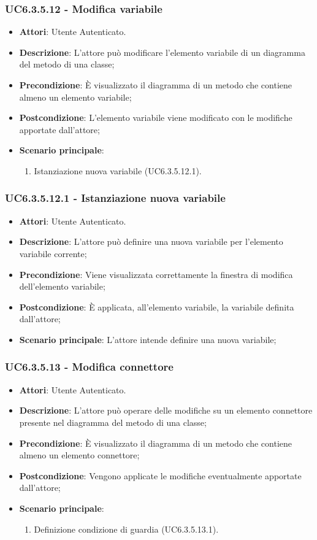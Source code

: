 \subsubsection{UC6.3.5.12 - Modifica variabile} 
\label{sssec:UC6.3.5.12} 
\begin{itemize} 
\item \textbf{Attori}: Utente Autenticato.
\item \textbf{Descrizione}: L'attore può modificare l'elemento variabile di un diagramma del metodo di una classe;
\item \textbf{Precondizione}: È visualizzato il diagramma di un metodo che contiene almeno un elemento variabile;
\item \textbf{Postcondizione}: L'elemento variabile viene modificato con le modifiche apportate dall'attore;
\item \textbf{Scenario principale}: \begin{enumerate}\item Istanziazione nuova variabile (UC6.3.5.12.1). 
 \end{enumerate}
\end{itemize} 
\subsubsection{UC6.3.5.12.1 - Istanziazione nuova variabile} 
\label{sssec:UC6.3.5.12.1} 
\begin{itemize} 
\item \textbf{Attori}: Utente Autenticato.
\item \textbf{Descrizione}: L'attore può definire una nuova variabile per l'elemento variabile corrente;
\item \textbf{Precondizione}: Viene visualizzata correttamente la finestra di modifica dell'elemento variabile;
\item \textbf{Postcondizione}: È applicata, all'elemento variabile, la variabile definita dall'attore;
\item \textbf{Scenario principale}: L'attore intende definire una nuova variabile;\end{itemize} 
\subsubsection{UC6.3.5.13 - Modifica connettore} 
\label{sssec:UC6.3.5.13} 
\begin{itemize} 
\item \textbf{Attori}: Utente Autenticato.
\item \textbf{Descrizione}: L'attore può operare delle modifiche su un elemento connettore presente nel diagramma del metodo di una classe;
\item \textbf{Precondizione}: È visualizzato il diagramma di un metodo che contiene almeno un elemento connettore;
\item \textbf{Postcondizione}: Vengono applicate le modifiche eventualmente apportate dall'attore;
\item \textbf{Scenario principale}: \begin{enumerate}\item Definizione condizione di guardia (UC6.3.5.13.1). 
 \end{enumerate}
\end{itemize} 
